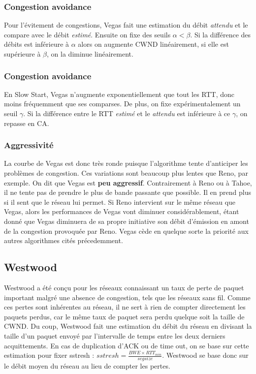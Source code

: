 \documentclass[	DIV=calc,%
							paper=a4,%
							fontsize=11pt,%
							twocolumn]{scrartcl}	 					%
\begin{document}
\subsubsection*{Congestion avoidance}
Pour l'évitement de congestions, Vegas fait une estimation du débit \textit{attendu} et le compare avec le débit \textit{estimé}. Ensuite on fixe des seuils $\alpha<\beta$. Si la différence des débits est inférieure à $\alpha$ alors on augmente CWND linéairement, si elle est supérieure à $ \beta $, on la diminue linéairement.
\subsubsection*{Congestion avoidance}
En Slow Start, Vegas n'augmente exponentiellement que tout les RTT, donc moins fréquemment que ses comparses. De plus, on fixe expérimentalement un seuil $\gamma$. Si la différence entre le RTT \textit{estimé} et le \textit{attendu} est inférieure à ce $\gamma$, on repasse en CA.
\subsubsection*{Aggressivité}
La courbe de Vegas est donc très ronde puisque l'algorithme tente d'anticiper les problèmes de congestion. Ces variations sont beaucoup plus lentes que Reno, par exemple. On dit que Vegas est \textbf{peu aggressif}. Contrairement à Reno ou à Tahoe, il ne tente pas de prendre le plus de bande passante que possible. Il en prend plus si il sent que le réseau lui permet. Si Reno intervient sur le même réseau que Vegas, alors les performances de Vegas vont diminuer considérablement, étant donné que Vegas diminuera de sa propre initiative son débit d'émission en amont de la congestion provoquée par Reno. Vegas cède en quelque sorte la priorité aux autres algorithmes cités précedemment.

\subsection*{Westwood}
Westwood a été conçu pour les réseaux connaissant un taux de perte de paquet important malgré une absence de congestion, tels que les réseaux sans fil. Comme ces pertes sont inhérentes au réseau, il ne sert à rien de compter directement les paquets perdus, car le même taux de paquet sera perdu quelque soit la taille de CWND. Du coup, Westwood fait une estimation du débit du réseau en divisant la taille d'un paquet envoyé par l'intervalle de temps entre les deux derniers acquittements. En cas de duplication d'ACK ou de time out, on se base sur cette estimation pour fixer sstresh : $sstresh=\frac{BWE \times RTT_{min}}{segsize} $. Westwood se base donc sur le débit moyen du réseau au lieu de compter les pertes.
\end{document}
